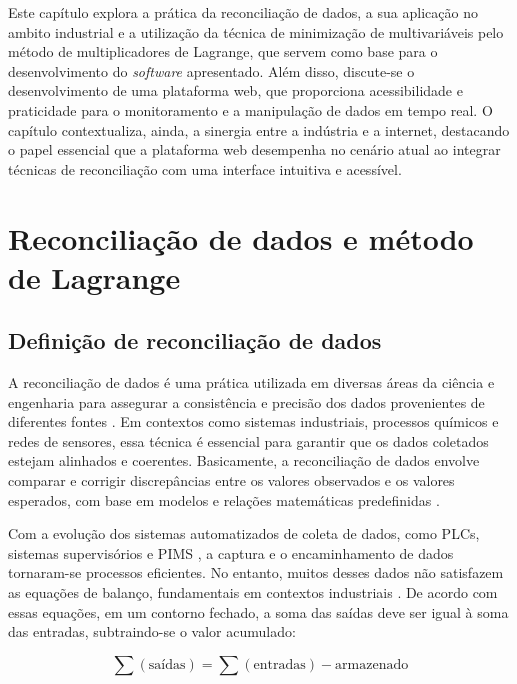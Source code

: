 \label{Cap:ReferencialTeorico}

Este capítulo explora a prática da reconciliação de dados, a sua aplicação no ambito industrial e a utilização da técnica de minimização de multivariáveis pelo método de multiplicadores de Lagrange, que servem como base para o desenvolvimento do \textit{software} apresentado. Além disso, discute-se o desenvolvimento de uma plataforma web, que proporciona acessibilidade e praticidade para o monitoramento e a manipulação de dados em tempo real. O capítulo contextualiza, ainda, a sinergia entre a indústria e a internet, destacando o papel essencial que a plataforma web desempenha no cenário atual ao integrar técnicas de reconciliação com uma interface intuitiva e acessível.

\section{Reconciliação de dados e método de Lagrange}

\subsection{Definição de reconciliação de dados}

A reconciliação de dados é uma prática utilizada em diversas áreas da ciência e engenharia para assegurar a consistência e precisão dos dados provenientes de diferentes fontes \cite{datarecshakar}. Em contextos como sistemas industriais, processos químicos e redes de sensores, essa técnica é essencial para garantir que os dados coletados estejam alinhados e coerentes. Basicamente, a reconciliação de dados envolve comparar e corrigir discrepâncias entre os valores observados e os valores esperados, com base em modelos e relações matemáticas predefinidas \cite{datarecragnoli}.

Com a evolução dos sistemas automatizados de coleta de dados, como PLCs, sistemas supervisórios e PIMS \cite{plcsupervisory2021}, a captura e o encaminhamento de dados tornaram-se processos eficientes. No entanto, muitos desses dados não satisfazem as equações de balanço, fundamentais em contextos industriais \cite{balance2020}. De acordo com essas equações, em um contorno fechado, a soma das saídas deve ser igual à soma das entradas, subtraindo-se o valor acumulado:

\begin{equation}
	\sum (\text{saídas}) = \sum (\text{entradas}) - \text{armazenado}
\end{equation}

